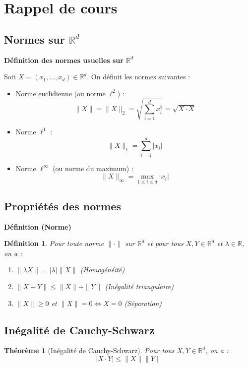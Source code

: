 \documentclass{article}
\newtheorem{theorem}{Théorème}
\newtheorem{definition}{Définition}
\begin{document}
\sloppy

\section{Rappel de cours}

\subsection*{Normes sur $\mathbb{R}^d$}

\textbf{Définition des normes usuelles sur $\mathbb{R}^d$}

Soit $X = (x_1, \dots, x_d) \in \mathbb{R}^d$. On définit les normes suivantes :
\begin{itemize}
    \item Norme euclidienne (ou norme $\ell^2$) :
    \[
    \|X\| = \|X\|_2 = \sqrt{\sum_{i=1}^d x_i^2} = \sqrt{X \cdot X}
    \]
    \item Norme $\ell^1$ :
    \[
    \|X\|_1 = \sum_{i=1}^d |x_i|
    \]
    \item Norme $\ell^\infty$ (ou norme du maximum) :
    \[
    \|X\|_\infty = \max_{1 \leq i \leq d} |x_i|
    \]
\end{itemize}

\subsection*{Propriétés des normes}

\textbf{Définition (Norme)}
\begin{definition}
Pour toute norme $\|\cdot\|$ sur $\mathbb{R}^d$ et pour tous $X, Y \in \mathbb{R}^d$ et $\lambda \in \mathbb{R}$, on a :
\begin{enumerate}
    \item $\|\lambda X\| = |\lambda| \|X\|$ (Homogénéité)
    \item $\|X + Y\| \leq \|X\| + \|Y\|$ (Inégalité triangulaire)
    \item $\|X\| \geq 0$ et $\|X\| = 0 \Leftrightarrow X = 0$ (Séparation)
\end{enumerate}
\end{definition}

\subsection*{Inégalité de Cauchy-Schwarz}

\begin{theorem}[Inégalité de Cauchy-Schwarz]
Pour tous $X, Y \in \mathbb{R}^d$, on a :
\[
|X \cdot Y| \leq \|X\| \|Y\|
\]
\end{theorem}
\end{document}
